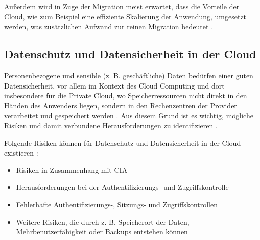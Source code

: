 Außerdem wird in Zuge der Migration meist erwartet, dass die Vorteile der Cloud, wie zum Beispiel eine effiziente Skalierung der Anwendung, umgesetzt werden, was zusätzlichen Aufwand zur reinen Migration bedeutet \cite[Vgl.][]{Ibryam2021}. \pagebreak

\subsection{Datenschutz und Datensicherheit in der Cloud}
Personenbezogene und sensible (z. B. geschäftliche) Daten bedürfen einer guten Datensicherheit, vor allem im Kontext des Cloud Computing und dort insbesondere für die Private Cloud, wo Speicherressourcen nicht direkt in den Händen des Anwenders liegen, sondern in den Rechenzentren der Provider verarbeitet und gespeichert werden \cite[Vgl.][S. 1ff]{Sun2019}. Aus diesem Grund ist es wichtig, mögliche Risiken und damit verbundene Herausforderungen zu identifizieren \cite[Vgl.][S. 3]{Sun2019}.

Folgende Risiken können für Datenschutz und Datensicherheit in der Cloud existieren \cite[Vgl. auch im folgenden][S. 694]{Kumar2018}:

\begin{itemize}
    \item Risiken in Zusammenhang mit \ac{CIA} 
    \item Herausforderungen bei der Authentifizierungs- und Zugriffskontrolle
    \item Fehlerhafte Authentifizierungs-, Sitzungs- und Zugriffskontrollen
    \item Weitere Risiken, die durch z. B. Speicherort der Daten, Mehrbenutzerfähigkeit oder Backups entstehen können
\end{itemize}

\pagebreak